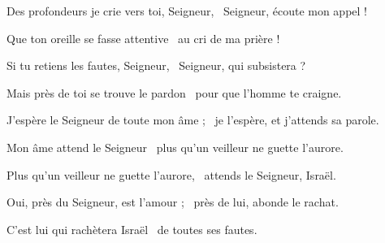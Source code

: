\item Des profondeurs je crie vers toi, Seigneur,~\psstar{} Seigneur, écoute mon appel !

\item Que ton oreille se fasse attentive~\psstar{} au cri de ma prière !

\item Si tu retiens les fautes, Seigneur,~\psstar{} Seigneur, qui subsistera ?

\item Mais près de toi se trouve le pardon~\psstar{} pour que l'homme te craigne.

\item J'espère le Seigneur de toute mon âme ;~\psstar{} je l'espère, et j'attends sa parole.

\item Mon âme attend le Seigneur~\psstar{} plus qu'un veilleur ne guette l'aurore.

\item Plus qu'un veilleur ne guette l'aurore,~\psstar{} attends le Seigneur, Israël.

\item Oui, près du Seigneur, est l'amour ;~\psstar{} près de lui, abonde le rachat.

\item C'est lui qui rachètera Israël~\psstar{} de toutes ses fautes.